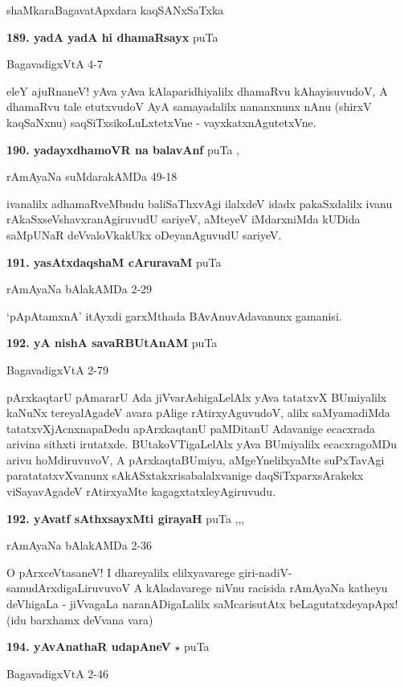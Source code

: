 \hfill shaMkaraBagavatApxdara kaqSANxSaTxka

\medskip
\noindent\textbf{189. yadA yadA hi dhamaRsayx} \hfill puTa \pageref{226a}

\hfill BagavadigxVtA 4-7

eleY ajuRnaneV! yAva yAva kAlaparidhiyalilx dhamaRvu kAhayisuvudoV, A dhamaRvu tale  etutxvudoV AyA samayadalilx nananxnunx nAnu (shirxV kaqSaNxnu) saqSiTxsikoLuLxtetxVne - vayxkatxnAgutetxVne.

\medskip
\noindent\textbf{190. yadayxdhamoVR na balavAnf} \hfill puTa \pageref{192b},\pageref{215}

\hfill rAmAyaNa suMdarakAMDa 49-18

ivanalilx adhamaRveMbudu baliSaThxvAgi ilalxdeV idadx pakaSxdalilx ivanu rAkaSxseVshavxranAgiruvudU sariyeV, aMteyeV iMdarxniMda kUDida saMpUNaR deVvaloVkakUkx oDeyanAguvudU sariyeV.

\medskip
\noindent\textbf{191. yasAtxdaqshaM cAruravaM} \hfill puTa \pageref{250}

\hfill rAmAyaNa bAlakAMDa 2-29

`pApAtamxnA' itAyxdi garxMthada BAvAnuvAdavanunx gamanisi.

\medskip
\noindent\textbf{192. yA nishA savaRBUtAnAM} \hfill puTa \pageref{138}

\hfill BagavadigxVtA 2-79

pArxkaqtarU pAmararU Ada jiVvarAshigaLelAlx yAva tatatxvX BUmiyalilx kaNuNx tereyalAgadeV avara pAlige rAtirxyAguvudoV, alilx saMyamadiMda tatatxvXjAcnxnapaDedu apArxkaqtanU paMDitanU Adavanige ecacxrada arivina sithxti irutatxde. BUtakoVTigaLelAlx yAva BUmiyalilx ecacxragoMDu arivu hoMdiruvuvoV, A pArxkaqtaBUmiyu, aMgeYnelilxyaMte suPxTavAgi paratatatxvXvanunx sAkASxtakxrisabalalxvanige daqSiTxparxsArakekx viSayavAgadeV rAtirxyaMte kagagxtatxleyAgiruvudu.

\medskip
\noindent\textbf{192. yAvatf sAthxsayxMti girayaH} \hfill puTa \pageref{158b},\pageref{166},\pageref{208b},\pageref{210b}

\hfill rAmAyaNa bAlakAMDa 2-36

O pArxceVtasaneV! I dhareyalilx elilxyavarege giri-nadiV-samudArxdigaLiruvuvoV A kAladavarege niVnu racisida rAmAyaNa katheyu deVhigaLa - jiVvagaLa naranADigaLalilx saMcarisutAtx beLagutatxdeyapApx! (idu barxhamx deVvana vara)

\medskip
\noindent\textbf{194. yAvAnathaR udapAneV} $\star$ \hfill puTa \pageref{14}

\hfill BagavadigxVtA 2-46

